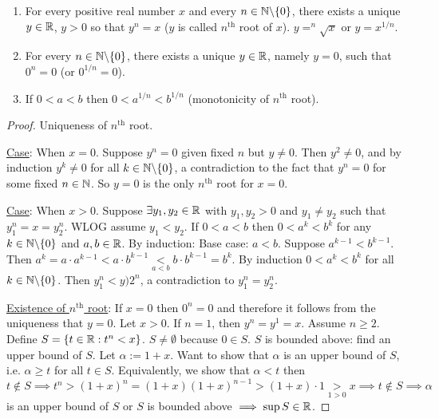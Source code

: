 \documentclass[]{article}
\begin{document}
\begin{theorem}
	\label{thm1.21}
	\begin{enumerate}
		\item For every positive real number $x$ and every $n\in\mathbb{N}\backslash \{0\}$, there exists a unique $y\in\mathbb{R}$, $y>0$ so that $y^n = x$ ($y$ is called $n^\text{th}$ root of $x$). $y = ^n\sqrt{x}$ or $y = x^{1/n}$.
		\item For every $n\in\mathbb{N}\backslash \{0\}$, there exists a unique $y\in\mathbb{R}$, namely \ul{$y=0$}, such that $0^n = 0$ (or $0^{1/n} = 0$).
		\item If $0<a<b$ then $0<a^{1/n} < b^{1/n}$ (monotonicity of $n^\text{th}$ root).
	\end{enumerate}
\end{theorem}
\begin{proof}
	Uniqueness of $n^\text{th}$ root.
	
	\ul{Case}: When $x=0$. Suppose $y^n = 0$ given fixed $n$ but $y\neq 0$. Then $y^2 \neq 0$, and by induction $y^k \neq 0$ for all $k\in \mathbb{N}\backslash\{0\}$, a contradiction to the fact that $y^n = 0$ for some fixed $n\in\mathbb{N}$. So $y=0$ is the only $n^\text{th}$ root for $x=0$.
	
	\ul{Case}: When $x>0$. Suppose $\exists y_1,y_2\in\mathbb{R}$ with $y_1,y_2>0$ and $y_1\neq y_2$ such that $y_1^n = x = y_2^n$. WLOG assume $y_1<y_2$. If $0<a<b$ then $0<a^k<b^k$ for any $k\in\mathbb{N}\backslash \{0\}$ and $a,b\in\mathbb{R}$. By induction: Base case: $a<b$. Suppose $a^{k-1} < b^{k-1}$. Then $a^k = a\cdot a^{k-1} < a\cdot b^{k-1} \underset{a<b}{<} b\cdot b^{k-1} = b^k$. By induction $0<a^k<b^k$ for all $k\in\mathbb{N}\backslash \{0\}$. Then $y_1^n<y)2^n$, a contradiction to $y_1^n = y_2^n$.
	
	\ul{Existence of $n^\text{th}$ root}: If $x=0$ then $0^n = 0$ and therefore it follows from the uniqueness that $y=0$. Let $x>0$. If $n=1$, then $y^n = y^1 = x$. Assume $n\geq 2$. Define $S = \{t\in\mathbb{R}: t^n < x\}$. $S\neq \emptyset$ because $0\in S$. $S$ is bounded above: find an upper bound of $S$. Let $\alpha := 1+x$. Want to show that $\alpha$ is an upper bound of $S$, i.e. $\alpha \geq t$ for all $t\in S$. Equivalently, we show that $\alpha < t$ then $t\notin S \implies t^n > (1+x)^n = (1+x)(1+x)^{n-1} > (1+x)\cdot 1 \underset{1>0}{>} x \implies t\notin S \implies \alpha$ is an upper bound of $S$ or $S$ is bounded above $\implies \sup S\in \mathbb{R}$.
\end{proof}

\newpage
\end{document}
